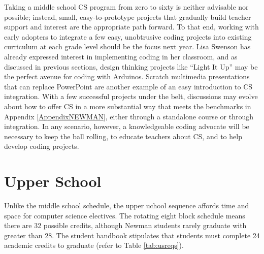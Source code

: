 Taking a middle school CS program from zero to sixty is neither advisable nor possible; instead, small, easy-to-prototype projects that gradually build teacher support and interest are the appropriate path forward. To that end, working with early adopters to integrate a few easy, unobtrusive coding projects into existing curriculum at each grade level should be the focus next year. Lisa Swenson has already expressed interest in implementing coding in her classroom, and as discussed in previous sections, design thinking projects like ``Light It Up'' may be the perfect avenue for coding with Arduinos. Scratch multimedia presentations that can replace PowerPoint are another example of an easy introduction to CS integration. With a few successful projects under the belt, discussions may evolve about how to offer CS in a more substantial way that meets the benchmarks in Appendix \ref{AppendixNEWMAN}, either through a standalone course or through integration. In any scenario, however, a knowledgeable coding advocate will be necessary to keep the ball rolling, to educate teachers about CS, and to help develop coding projects.

\section{Upper School}
Unlike the middle school schedule, the upper uchool sequence affords time and space for computer science electives. The rotating eight block schedule means there are 32 possible credits, although Newman students rarely graduate with greater than 28. The student handbook stipulates that students must complete 24 academic credits to graduate (refer to Table \ref{tab:usreqs}). \par

